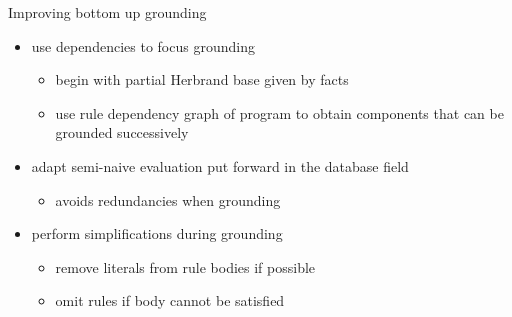 \begin{frame}{Improving bottom up grounding}
  \bigskip
  \begin{itemize}
  \item use dependencies to \alert{focus} grounding
    \begin{itemize}\normalsize
    \item begin with partial Herbrand base given by facts
    \item use rule dependency graph of program to obtain \alert{components} that can be \alert{grounded successively}
    \end{itemize}
    \medskip
  \item adapt \alert{semi-naive evaluation} put forward in the database field
    \begin{itemize}\normalsize
    \item avoids redundancies when grounding
    \end{itemize}
    \medskip
  \item perform \alert{simplifications} during grounding
    \begin{itemize}\normalsize
    \item remove literals from rule bodies if possible
    \item omit rules if body cannot be satisfied
    \end{itemize}
  \end{itemize}
\end{frame}
